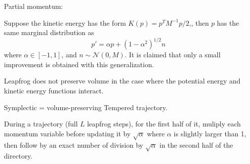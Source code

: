 \documentclass{book}
\begin{document}
\begin{enumerate}
Partial momentum:

Suppose the kinetic energy has the form $K(p) = p^TM^{-1}p/2$,, then $p$ has the same marginal distribution as 
\[ p' = \alpha p + (1-\alpha^2)^{1/2} n \]
where $\alpha \in [-1,1]$, and $n \sim \mathcal{N}(0,M)$. 
It is claimed that only a small improvement is obtained with this generalization.

Leapfrog does not preserve volume in the case where the potential energy and kinetic energy functions interact.

Symplectic  = volume-preserving
Tempered trajectory. 

During a trajectory (full $L$ leapfrog steps), for the first half of it, muliply
each momentum variable before updating it by $\sqrt{\alpha}$ where $\alpha$ is slightly larger than
1, then follow by an exact number of division by $\sqrt{\alpha}$ in the second
half of the directory. \cite{neal1996sampling}

\end{enumerate}
\end{document}
